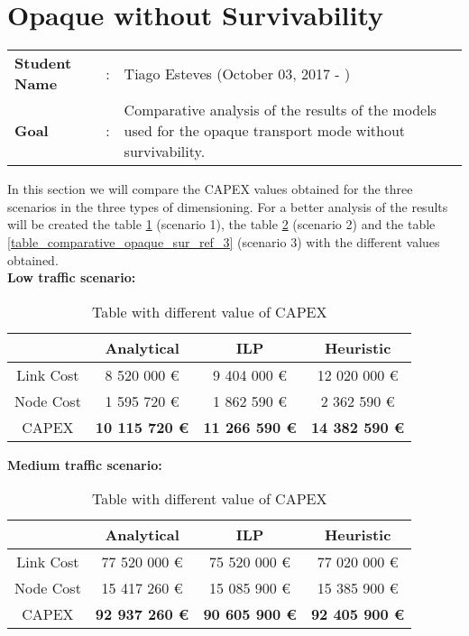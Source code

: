 \clearpage

\section{Opaque without Survivability}\label{comparative_Opaque_Survivability}
\begin{tcolorbox}	
\begin{tabular}{p{2.75cm} p{0.2cm} p{10.5cm}} 	
\textbf{Student Name}  &:& Tiago Esteves    (October 03, 2017 - )\\
\textbf{Goal}          &:& Comparative analysis of the results of the models used for the opaque transport mode without survivability.
\end{tabular}
\end{tcolorbox}
\vspace{11pt}


In this section we will compare the CAPEX values obtained for the three scenarios in the three types of dimensioning. For a better analysis of the results will be created the table \ref{table_comparative_opaque_sur_ref_1} (scenario 1), the table \ref{table_comparative_opaque_sur_ref_2} (scenario 2) and the table \ref{table_comparative_opaque_sur_ref_3} (scenario 3) with the different values obtained.\\

\textbf{Low traffic scenario:}\\

\begin{table}[h!]
\centering
\begin{tabular}{| c | c | c | c |}
 \hline
   & Analytical & ILP & Heuristic \\
 \hline\hline
 Link Cost & 8 520 000 \euro & 9 404 000 \euro & 12 020 000 \euro \\
 Node Cost & 1 595 720 \euro & 1 862 590 \euro & 2 362 590 \euro \\
 CAPEX & \textbf{10 115 720 \euro} & \textbf{11 266 590 \euro} & \textbf{14 382 590 \euro} \\
 \hline
\end{tabular}
\caption{Table with different value of CAPEX }
\label{table_comparative_opaque_sur_ref_1}
\end{table}


\vspace{11pt}
\textbf{Medium traffic scenario:}\\

\begin{table}[h!]
\centering
\begin{tabular}{| c | c | c | c |}
 \hline
   & Analytical & ILP & Heuristic \\
 \hline\hline
 Link Cost & 77 520 000 \euro & 75 520 000 \euro & 77 020 000 \euro \\
 Node Cost & 15 417 260 \euro & 15 085 900 \euro & 15 385 900 \euro \\
 CAPEX & \textbf{92 937 260 \euro} & \textbf{90 605 900 \euro} & \textbf{92 405 900 \euro} \\
 \hline
\end{tabular}
\caption{Table with different value of CAPEX }
\label{table_comparative_opaque_sur_ref_2}
\end{table}


